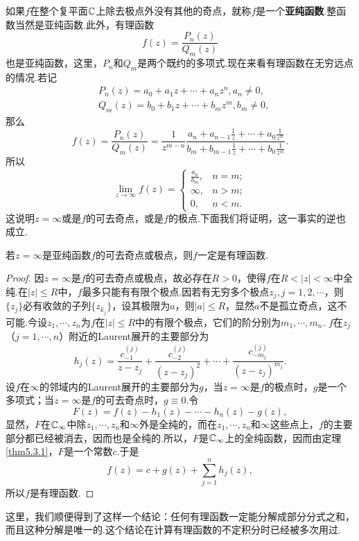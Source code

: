 如果$f$在整个复平面$\mathbb C$上除去极点外没有其他的奇点，就称$f$是一个\textbf{亚纯函数}.整函数当然是亚纯函数.此外，有理函数
\[
  f(z) = \frac{P_n(z)}{Q_m(z)}
\]
也是亚纯函数，这里，$P_n$和$Q_m$是两个既约的多项式.现在来看有理函数在无穷远点的情况.若记
\begin{align*}
  & P_n(z) = a_0 + a_1z + \cdots + a_nz^n, a_n \ne 0,\\
  & Q_m(z) = b_0 + b_1z + \cdots + b_mz^m, b_m \ne 0,
\end{align*}
那么
\[
  f(z) = \frac{P_n(z)}{Q_m(z)} = \frac1{z^{m-n}}\frac{a_n+a_{n-1}\frac1z+\cdots+a_0\frac1{z^n}}
  {b_m+b_{m-1}\frac1z+\cdots+b_0\frac1{z^m}}.
\]
所以
\[
  \lim_{z\to\infty}f(z) = \begin{cases}
     \frac{a_n}{b_m}, & n = m; \\
       \infty, & n > m; \\
        0, & n < m.
   \end{cases}
\]
这说明$z=\infty$或是$f$的可去奇点，或是$f$的极点.下面我们将证明，这一事实的逆也成立.
\begin{theorem}\label{thm5.3.3}
  若$z=\infty$是亚纯函数$f$的可去奇点或极点，则$f$一定是有理函数.
\end{theorem}
\begin{proof}
  因$z=\infty$是$f$的可去奇点或极点，故必存在$R>0$，使得$f$在$R<|z|<\infty$中全纯.在$|z|\le R $中，$f$最多只能有有限个极点.因若有无穷多个极点$z_j,j=1,2,\cdots$，则$\{z_j\}$必有收敛的子列$\{z_{k_j}\}$，设其极限为$a$，则$|a|\le R$，显然$a$不是孤立奇点，这不可能.今设$z_1,\cdots,z_n$为$f$在$|z|\le R$中的有限个极点，它们的阶分别为$m_1,\cdots,m_n$. $f$在$z_j$（$j=1,\cdots,n$）附近的Laurent展开的主要部分为
  \[
    h_j(z) = \frac{c_{-1}^{(j)}}{z-z_j} + \frac{c_{-2}^{(j)}}{(z-z_j)^2}
    + \cdots + \frac{c_{-m_j}^{(j)}}{(z-z_j)^{m_j}}.
  \]
  设$f$在$\infty$的邻域内的Laurent展开的主要部分为$g$，当$z=\infty$是$f$的极点时，$g$是一个多项式；当$z=\infty$是$f$的可去奇点时，$g\equiv0$.令
  \[
    F(z) = f(z) - h_1(z) - \cdots - h_n(z) - g(z),
  \]
  显然，$F$在$\mathbb C_\infty$中除$z_1,\cdots,z_n$和$\infty$外是全纯的，而在$z_1,\cdots,z_n$和$\infty$这些点上，$f$的主要部分都已经被消去，因而也是全纯的.所以，$F$是$\mathbb C_\infty$上的全纯函数，因而由定理 \ref{thm5.3.1}，$F$是一个常数$c$.于是
  \[
    f(z) = c + g(z) + \sum_{j=1}^n h_j(z),
  \]
  所以$f$是有理函数.
\end{proof}

这里，我们顺便得到了这样一个结论：任何有理函数一定能分解成部分分式之和，而且这种分解是唯一的.这个结论在计算有理函数的不定积分时已经被多次用过.

